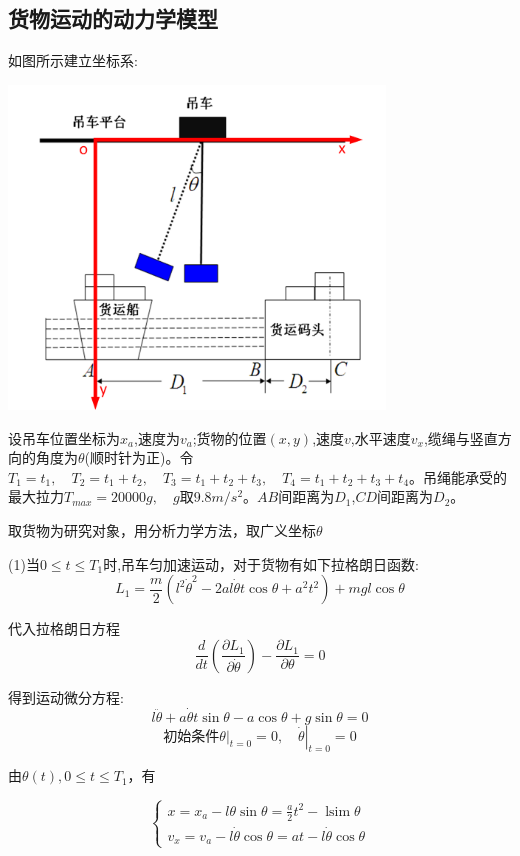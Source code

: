 \documentclass[withoutpreface,bwprint]{cumcmthesis} %
\begin{document}
\subsection{货物运动的动力学模型}
如图所示建立坐标系:

\centerline{\includegraphics[width=10cm]{1.png}}
设吊车位置坐标为$x_a$,速度为$v_a$;货物的位置$(x,y)$,速度$v$,水平速度$v_{x}$,缆绳与竖直方向的角度为$\theta$(顺时针为正)。令$T_1=t_1,\quad T_2=t_1+t_2,\quad T_3=t_1+t_2+t_3,\quad T_4=t_1+t_2+t_3+t_4$。吊绳能承受的最大拉力$T_{max}=20000g,\quad g$取$9.8m/s^2$。$AB$间距离为$D_1$,$CD$间距离为$D_2$。

取货物为研究对象，用分析力学方法，取广义坐标$\theta$

(1)当$0 \leq t \leq T_1$时,吊车匀加速运动，对于货物有如下拉格朗日函数:
$$L_{1}=\frac{m}{2}\left(l^{2} \dot{\theta}^{2}-2 a l \dot{\theta} t \cos \theta+a^{2} t^{2}\right)+m gl\cos \theta$$

代入拉格朗日方程$$\frac{d}{d t}\left(\frac{\partial L_{1}}{\partial \dot{\theta}}\right)-\frac{\partial L_1}{\partial \theta}=0$$

得到运动微分方程:$$l \ddot{\theta}+a \dot{\theta} t \sin \theta-a \cos \theta+g \sin \theta=0$$
$$\text{初始条件}\left.\theta\right|_{t=0}=0,\left.\quad \dot{\theta}\right|_{t=0}=0$$

由$\theta(t),0 \leqslant t \leqslant T_{1}$，有

$$\left\{\begin{array}{l}
        x=x_{a}-l \theta \sin \theta=\frac{a}{2} t^{2}-\operatorname{lsim} \theta \\
        v_{x}=v_{a}-l \dot{\theta} \cos \theta=a t-l \dot{\theta} \cos \theta
    \end{array}\right.$$
\end{document}
